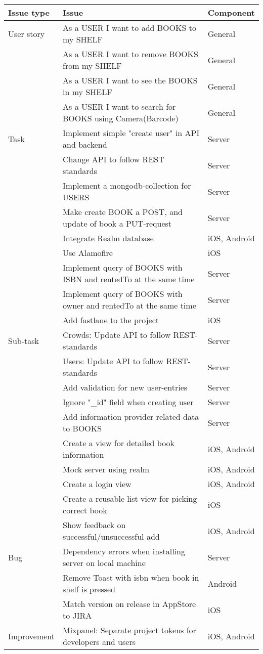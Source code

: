 \begin{longtable}{|L{2cm}|L{10cm}|L{3cm}|}
 \hline
\textbf{Issue type} & \textbf{Issue} & \textbf{Component} \\
 \hline
User story & As a USER I want to add BOOKS to my SHELF & General \\
 \hline
 & As a USER I want to remove BOOKS from my SHELF & General \\
  \hline
 & As a USER I want to see the BOOKS in my SHELF & General \\
  \hline
 & As a USER I want to search for BOOKS using Camera(Barcode) & General \\
  \hline
Task & Implement simple "create user" in API and backend & Server \\
 \hline
 & Change API to follow REST standards & Server \\
  \hline
 & Implement a mongodb-collection for USERS & Server \\
  \hline
 & Make create BOOK a POST, and update of book a PUT-request & Server \\
  \hline
 & Integrate Realm database & iOS, Android \\
  \hline
 & Use Alamofire & iOS \\
  \hline
 & Implement query of BOOKS with ISBN and rentedTo at the same time & Server \\
  \hline
 & Implement query of BOOKS with owner and rentedTo at the same time & Server \\
  \hline
 & Add fastlane to the project & iOS \\
  \hline
Sub-task & Crowds: Update API to follow REST-standards & Server \\
 \hline
 & Users: Update API to follow REST-standards & Server \\
  \hline
 & Add validation for new user-entries & Server \\
  \hline
 & Ignore "\_id" field when creating user & Server \\
  \hline
 & Add information provider related data to BOOKS & Server \\
  \hline
 & Create a view for detailed book information & iOS, Android \\
  \hline
 & Mock server using realm & iOS, Android \\
  \hline
  & Create a login view & iOS, Android \\
   \hline
 & Create a reusable list view for picking correct book & iOS \\
  \hline
 & Show feedback on successful/unsuccessful add & iOS, Android \\
  \hline
Bug & Dependency errors when installing server on local machine & Server \\
 \hline
 & Remove Toast with isbn when book in shelf is pressed & Android \\
  \hline
 & Match version on release in AppStore to JIRA & iOS \\
  \hline
Improvement & Mixpanel: Separate project tokens for developers and users & iOS, Android \\
 \hline


\end{longtable}

